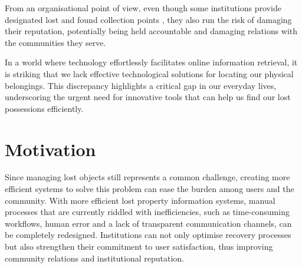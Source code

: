 From an organisational point of view, even though some institutions provide designated lost and found collection points \cite{Tan2023}, they also run the risk of damaging their reputation, potentially being held accountable and damaging relations with the communities they serve.

In a world where technology effortlessly facilitates online information retrieval, it is striking that we lack effective technological solutions for locating our physical belongings.
This discrepancy highlights a critical gap in our everyday lives, underscoring the urgent need for innovative tools that can help us find our lost possessions efficiently.

\section{Motivation}

Since managing lost objects still represents a common challenge, creating more efficient systems to solve this problem can ease the burden among users and the community.
With more efficient lost property information systems, manual processes that are currently riddled with inefficiencies, such as time-consuming workflows, human error and a lack of transparent communication channels, can be completely redesigned.
Institutions can not only optimise recovery processes but also strengthen their commitment to user satisfaction, thus improving community relations and institutional reputation.

